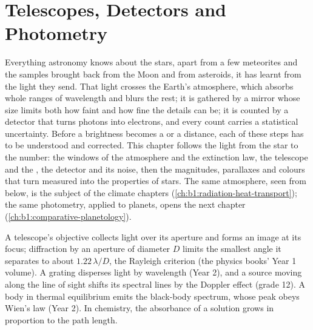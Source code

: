 \chapter{Telescopes, Detectors and Photometry}\label{ch:b1:observing-the-sky}

Everything astronomy knows about the stars, apart from a few meteorites and
the samples brought back from the Moon and from asteroids, it has learnt from
the light they send. That light crosses the Earth's atmosphere, which absorbs
whole ranges of wavelength and blurs the rest; it is gathered by a mirror
whose size limits both how faint and how fine the details can be; it is
counted by a detector that turns photons into electrons, and every count
carries a statistical uncertainty. Before a brightness becomes a 
or a distance, each of these steps has to be understood and corrected. This
chapter follows the light from the star to the number: the windows of the
atmosphere and the extinction law, the telescope and the , the
detector and its noise, then the magnitudes, parallaxes and colours that
turn measured  into the properties of stars. The same atmosphere, seen
from below, is the subject of the climate chapters
(\cref{ch:b1:radiation-heat-transport}); the same photometry, applied to
planets, opens the next chapter (\cref{ch:b1:comparative-planetology}).

\begin{recall}
A telescope's objective collects light over its aperture and forms an image
at its focus; diffraction by an aperture of diameter $D$ limits the smallest
angle it separates to about $1.22\,\lambda/D$, the Rayleigh criterion (the
physics books' Year 1 volume). A grating disperses light by wavelength
(Year 2), and a source moving along the line of sight shifts its spectral
lines by the Doppler effect (grade 12). A body in thermal equilibrium emits
the black-body spectrum, whose peak obeys Wien's law (Year 2). In chemistry,
the absorbance of a solution grows in proportion to the path length.
\end{recall}

